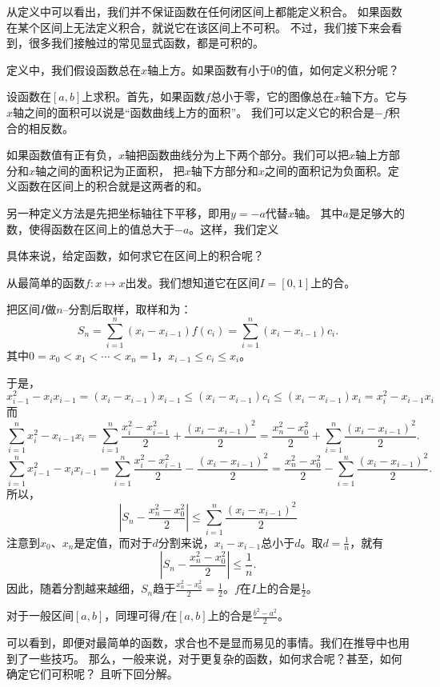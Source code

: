 \documentclass[12pt,UTF8]{ctexbook}
\begin{document}
从定义中可以看出，我们并不保证函数在任何闭区间上都能定义积合。
如果函数在某个区间上无法定义积合，就说它在该区间上不可积。
不过，我们接下来会看到，很多我们接触过的常见显式函数，都是可积的。

定义中，我们假设函数总在$x$轴上方。如果函数有小于$0$的值，如何定义积分呢？

设函数在$[a,b]$上求积。首先，如果函数$f$总小于零，它的图像总在$x$轴下方。它与$x$轴之间的面积可以说是“函数曲线上方的面积”。
我们可以定义它的积合是$-f$积合的相反数。

如果函数值有正有负，$x$轴把函数曲线分为上下两个部分。我们可以把$x$轴上方部分和$x$轴之间的面积记为正面积，
把$x$轴下方部分和$x$之间的面积记为负面积。定义函数在区间上的积合就是这两者的和。

另一种定义方法是先把坐标轴往下平移，即用$y = -a $代替$x$轴。
其中$a$是足够大的数，使得函数在区间上的值总大于$-a$。这样，我们定义

具体来说，给定函数，如何求它在区间上的积合呢？

从最简单的函数$f: x\mapsto x$出发。我们想知道它在区间$I = [0, 1]$上的合。

把区间$I$做$n$–分割后取样，取样和为：
$$ S_n = \sum_{i=1}^n (x_i - x_{i-1}) f(c_i) = \sum_{i=1}^n (x_i - x_{i-1}) c_i. $$
其中$0 = x_0 < x_1 < \cdots < x_n = 1$，$x_{i-1} \leqslant c_i \leqslant x_i$。

于是，
$$ x_{i-1}^2 - x_i x_{i-1} = (x_i - x_{i-1}) x_{i-1} \leqslant (x_i - x_{i-1}) c_i \leqslant (x_i - x_{i-1}) x_i = x_i^2 - x_{i-1} x_i $$
而
$$ \sum_{i=1}^n x_i^2 - x_{i-1} x_i = \sum_{i=1}^n \frac{x_i^2 - x_{i-1}^2}{2} + \frac{(x_i - x_{i-1})^2}{2} = \frac{x_n^2 - x_0^2}{2} + \sum_{i=1}^n\frac{(x_i - x_{i-1})^2}{2}. $$
$$ \sum_{i=1}^n x_{i-1}^2 - x_i x_{i-1} = \sum_{i=1}^n \frac{x_i^2 - x_{i-1}^2}{2} - \frac{(x_i - x_{i-1})^2}{2} = \frac{x_n^2 - x_0^2}{2} - \sum_{i=1}^n\frac{(x_i - x_{i-1})^2}{2}. $$
所以，
$$ \left| S_n - \frac{x_n^2 - x_0^2}{2} \right| \leqslant \sum_{i=1}^n\frac{(x_i - x_{i-1})^2}{2} $$
注意到$x_0$、$x_n$是定值，而对于$d$分割来说，$x_i - x_{i-1}$总小于$d$。取$d = \frac{1}{n}$，就有
$$ \left| S_n - \frac{x_n^2 - x_0^2}{2} \right| \leqslant \frac{1}{n}. $$
因此，随着分割越来越细，$S_n$趋于$\frac{x_n^2 - x_0^2}{2} = \frac{1}{2}$。$f$在$I$上的合是$\frac{1}{2}$。

对于一般区间$[a, b]$，同理可得$f$在$[a, b]$上的合是$\frac{b^2 - a^2}{2}$。

可以看到，即便对最简单的函数，求合也不是显而易见的事情。我们在推导中也用到了一些技巧。
那么，一般来说，对于更复杂的函数，如何求合呢？甚至，如何确定它们可积呢？
且听下回分解。
\end{document}
